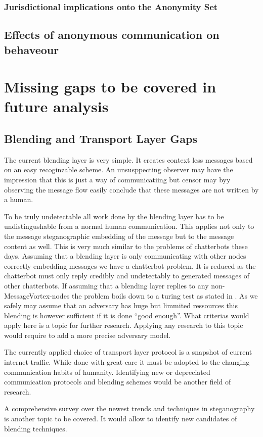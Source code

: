 \subsection{Jurisdictional implications onto the Anonymity Set}

\section{Effects of anonymous communication on behaveour}




\chapter{Missing gaps to be covered in future analysis}
\section{Blending and Transport Layer Gaps}
The current blending layer is very simple. It creates context less messages based on an easy recoginzable scheme. An unsusppecting observer may have the impression that this is just a way of communicatiing but censor may byy observing the message flow easily conclude that these messages are not written by a human.

To be truly undetectable all work done by the blending layer has to be undistingushable from a normal human communication. This applies not only to the message steganographic embedding of the message but to the message content as well. This is very much similar to the problems of chatterbots these days. Assuming that a blending layer is only communicating with other nodes correctly embedding messages we have a chatterbot problem. It is reduced as the chatterbot must only reply credibly and undetectably to generated messages of other chatterbots. If assuming that a blending layer replies to any non-MessageVortex-nodes the problem boils down to a turing test as stated in \cite{turing1950computing}. As we safely may assume that an adversary has huge but limmited ressources this blending is however sufficient if it is done ``good enough''. What criterias would apply here is a topic for further research. Applying any research to this topic would require to add a more precise adversary model.

The currently applied choice of transport layer protocol is a snapshot of current internet traffic. While done with great care it must be adopted to the changing communication habits of humanity. Identifying new or depreciated communication protocols and blending schemes would be another field of research.

A comprehensive survey over the newest trends and techniques in steganography is another topic to be covered. It would allow to identify new candidates of blending techniques.

